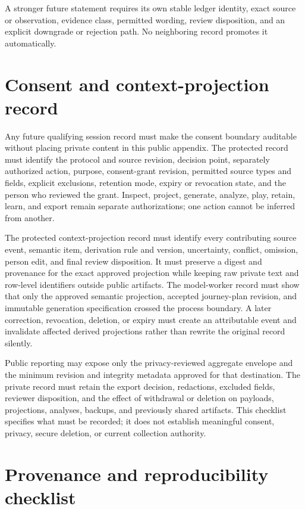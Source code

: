 A stronger future statement requires its own stable ledger identity, exact
source or observation, evidence class, permitted wording, review disposition,
and an explicit downgrade or rejection path. No neighboring record promotes it
automatically.

\section{Consent and context-projection record}
\label{app:consent-context-record}

Any future qualifying session record must make the consent boundary auditable
without placing private content in this public appendix. The protected record
must identify the protocol and source revision, decision point, separately
authorized action, purpose, consent-grant revision, permitted source types and
fields, explicit exclusions, retention mode, expiry or revocation state, and
the person who reviewed the grant. Inspect, project, generate, analyze, play,
retain, learn, and export remain separate authorizations; one action cannot be
inferred from another.

The protected context-projection record must identify every contributing source
event, semantic item, derivation rule and version, uncertainty, conflict,
omission, person edit, and final review disposition. It must preserve a digest
and provenance for the exact approved projection while keeping raw private text
and row-level identifiers outside public artifacts. The model-worker record must
show that only the approved semantic projection, accepted journey-plan revision,
and immutable generation specification crossed the process boundary. A later
correction, revocation, deletion, or expiry must create an attributable event
and invalidate affected derived projections rather than rewrite the original
record silently.

Public reporting may expose only the privacy-reviewed aggregate envelope and
the minimum revision and integrity metadata approved for that destination. The
private record must retain the export decision, redactions, excluded fields,
reviewer disposition, and the effect of withdrawal or deletion on payloads,
projections, analyses, backups, and previously shared artifacts. This checklist
specifies what must be recorded; it does not establish meaningful consent,
privacy, secure deletion, or current collection authority.

\section{Provenance and reproducibility checklist}
\label{app:provenance-reproducibility}

